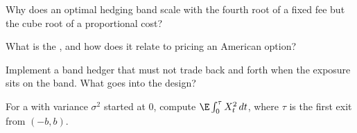 \begin{interviewq}\label{iq:qm:optimal-stopping-and-impulse-control:3}
Why does an optimal hedging band scale with the fourth root of a fixed fee but the cube root of a proportional cost?
\end{interviewq}

\begin{interviewq}\label{iq:qm:optimal-stopping-and-impulse-control:4}
What is the , and how does it relate to pricing an American option?
\end{interviewq}

\begin{interviewq}\label{iq:qm:optimal-stopping-and-impulse-control:5}
Implement a band hedger that must not trade back and forth when the exposure sits on the band. What goes into the design?
\end{interviewq}

\begin{interviewq}\label{iq:qm:optimal-stopping-and-impulse-control:6}
For a  with variance $\sigma^2$ started at 0, compute $\E\int_0^\tau X_t^2\,dt$, where $\tau$ is the first exit from $(-b, b)$.
\end{interviewq}
